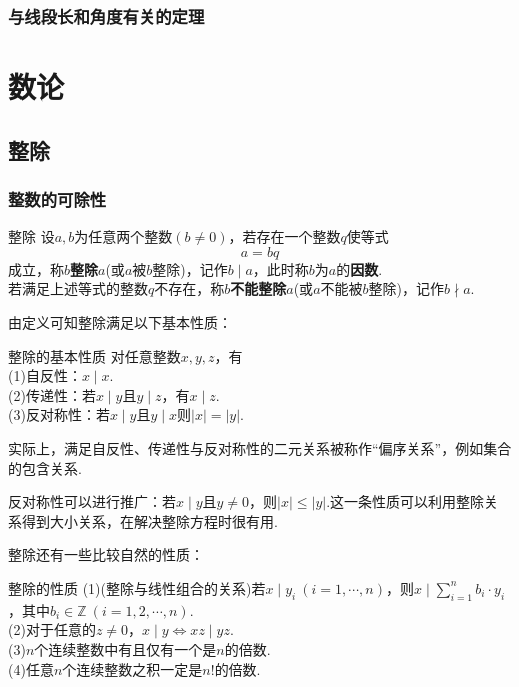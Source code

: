 \documentclass[lang=cn, zihao=5]{elegantbook}
\begin{document}
\section{与线段长和角度有关的定理}

\part{数论}

\chapter{整除}

\section{整数的可除性}

\begin{definition}{整除}
	设$a,b$为任意两个整数$(b \neq 0)$，若存在一个整数$q$使等式$$a=bq$$成立，称$b$\textbf{整除}$a$(或$a$被$b$整除)，记作$b \mid a$，此时称$b$为$a$的\textbf{因数}. \\
	若满足上述等式的整数$q$不存在，称$b$\textbf{不能整除}$a$(或$a$不能被$b$整除)，记作$b \nmid a$.
\end{definition}

由定义可知整除满足以下基本性质：

\begin{theorem}{整除的基本性质}
	对任意整数$x,y,z$，有 \\
	(1)自反性：$x \mid x$. \\
	(2)传递性：若$x \mid y$且$y \mid z$，有$x \mid z$. \\
	(3)反对称性：若$x \mid y$且$y \mid x$则$|x|=|y|$.
\end{theorem}
\begin{remark}
	实际上，满足自反性、传递性与反对称性的二元关系被称作“偏序关系”，例如集合的包含关系.
\end{remark}
\begin{remark}
	反对称性可以进行推广：若$x \mid y$且$y \neq 0$，则$|x| \leq |y|$.这一条性质可以利用整除关系得到大小关系，在解决整除方程时很有用.
\end{remark}

整除还有一些比较自然的性质：

\begin{theorem}{整除的性质}
	(1)(整除与线性组合的关系)若$x \mid y_i~(i=1,\cdots ,n)$，则$x \mid \sum_{i=1}^{n} b_i \cdot y_i$，其中$b_i \in \mathbb{Z}~(i=1,2,\cdots ,n)$. \\
	(2)对于任意的$z \neq 0$，$x \mid y \Leftrightarrow xz \mid yz$. \\
	(3)$n$个连续整数中有且仅有一个是$n$的倍数. \\
	(4)任意$n$个连续整数之积一定是$n!$的倍数.
\end{theorem}
\end{document}
